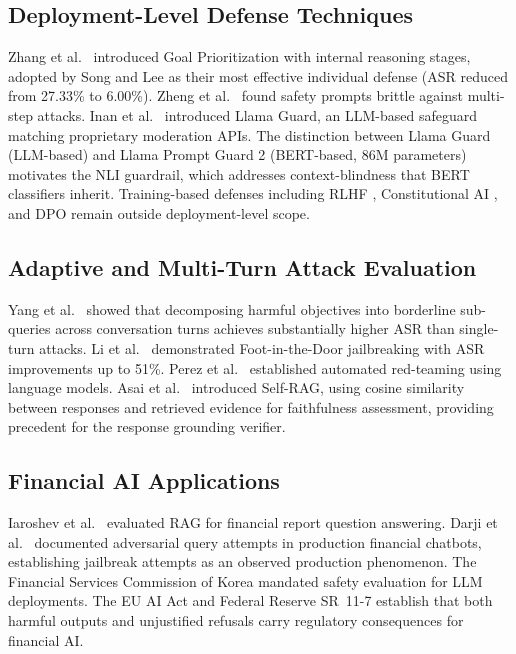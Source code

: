 \documentclass[journal,10pt]{IEEEtran}
\begin{document}
\subsection{Deployment-Level Defense Techniques}

Zhang et al.\ \cite{zhang2024defending} introduced Goal Prioritization with internal reasoning stages, adopted by Song and Lee as their most effective individual defense (ASR reduced from 27.33\% to 6.00\%). Zheng et al.\ \cite{zheng2024prompt} found safety prompts brittle against multi-step attacks. Inan et al.\ \cite{inan2023llama} introduced Llama Guard, an LLM-based safeguard matching proprietary moderation APIs. The distinction between Llama Guard (LLM-based) and Llama Prompt Guard 2 (BERT-based, 86M parameters) motivates the NLI guardrail, which addresses context-blindness that BERT classifiers inherit. Training-based defenses including RLHF \cite{ouyang2022training}, Constitutional AI \cite{bai2022constitutional}, and DPO \cite{rafailov2023direct} remain outside deployment-level scope.

\subsection{Adaptive and Multi-Turn Attack Evaluation}

Yang et al.\ \cite{yang2024multiturn} showed that decomposing harmful objectives into borderline sub-queries across conversation turns achieves substantially higher ASR than single-turn attacks. Li et al.\ \cite{li2025fitd} demonstrated Foot-in-the-Door jailbreaking with ASR improvements up to 51\%. Perez et al.\ \cite{perez2022red} established automated red-teaming using language models. Asai et al.\ \cite{asai2024selfrag} introduced Self-RAG, using cosine similarity between responses and retrieved evidence for faithfulness assessment, providing precedent for the response grounding verifier.

\subsection{Financial AI Applications}

Iaroshev et al.\ \cite{iaroshev2024evaluating} evaluated RAG for financial report question answering. Darji et al.\ \cite{darji2024rag} documented adversarial query attempts in production financial chatbots, establishing jailbreak attempts as an observed production phenomenon. The Financial Services Commission of Korea \cite{fsc2025regulatory} mandated safety evaluation for LLM deployments. The EU AI Act \cite{euaiact2024} and Federal Reserve SR~11-7 \cite{federalreserve2011sr} establish that both harmful outputs and unjustified refusals carry regulatory consequences for financial AI.
\end{document}
